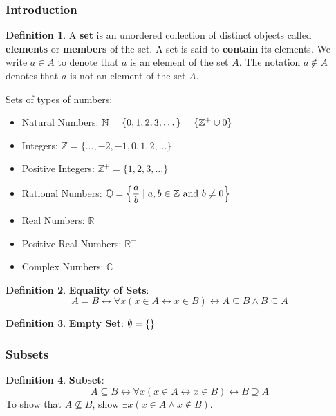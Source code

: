 \documentclass[article, 11pt]{article}
\theoremstyle{definition}
\newtheorem{definition}{Definition}[subsubsection]
\newcommand{\lra}{\leftrightarrow} %
\newcommand{\df}{\displaystyle\frac} %
\DeclarePairedDelimiter\set{\{}{\}}
\newcommand{\unite}{\cup}
\newcommand{\reals}{\mathbb{R}}
\newcommand{\ints}{\mathbb{Z}}
\newcommand{\posints}{\mathbb{Z}^+}
\newcommand{\nats}{\mathbb{N}} %
\newcommand{\rats}{\mathbb{Q}}
\newcommand{\comps}{\mathbb{C}}
\begin{document}
    \subsubsection{Introduction}
    \begin{definition}
        A \textbf{set} is an unordered collection of distinct objects called \textbf{elements} or \textbf{members} of the set. A set is said to \textbf{contain} its elements. We write $a \in A$ to denote that $a$ is an element of the set $A$. The notation $a \notin A$ denotes that $a$ is not an element of the set $A$.   
    \end{definition}

    Sets of types of numbers:
    \begin{itemize}
        \item Natural Numbers: $\nats = \{0, 1, 2, 3, \dots\} = \set*{\posints \unite 0}$
        \item Integers: $\ints = \{..., -2, -1, 0, 1, 2, \dots\}$
        \item Positive Integers: $\ints^+ = \{1, 2, 3, \dots\}$
        \item Rational Numbers: $\rats = \set*{\df{a}{b} \mid a, b \in \ints \text{ and } b \neq 0}$
        \item Real Numbers: $\reals$
        \item Positive Real Numbers: $\reals^+$
        \item Complex Numbers: $\comps$
    \end{itemize}

    \begin{definition}
        \textbf{Equality of Sets}:
        \begin{equation*}
            A=B \lra \forall x (x \in A \lra x \in B) \lra A \subseteq B \land B \subseteq A   
        \end{equation*}
    \end{definition}

    \begin{definition}
        \textbf{Empty Set}: $\emptyset = \set*{}$
    \end{definition}
    \subsubsection{Subsets}
    \begin{definition}
        \textbf{Subset}:
        \begin{equation*}
            A \subseteq B \lra \forall x (x \in A \lra x \in B) \lra B \supseteq A
        \end{equation*}
        To show that $A \not\subseteq B$, show $\exists x (x \in A \land x \not\in B)$.
    \end{definition}
\end{document}
